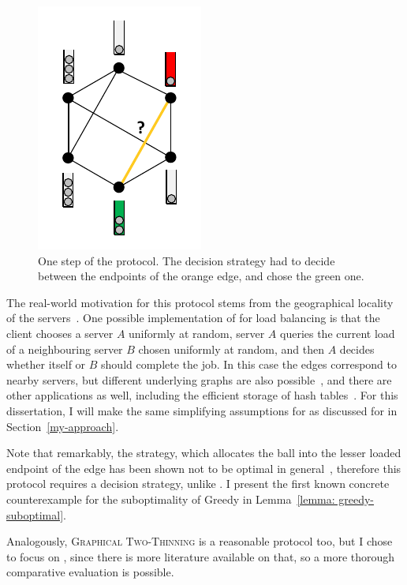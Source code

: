 \begin{figure}[hbt!]
    \centering
    \includegraphics[scale=1.5]{Chapter2/Figs/graphical_two_choice_intro.pdf}
    \caption{One step of the \GraphicalTwoChoice protocol. The decision strategy had to decide between the endpoints of the orange edge, and chose the green one.}
    \label{graphical-two-choice-intro}
\end{figure}

The real-world motivation for this protocol stems from the geographical locality of the servers~\cite{krishnaram2006graphicaltwochoiceoriginal}. One possible implementation of \GraphicalTwoChoice for load balancing is that the client chooses a server $A$ uniformly at random, server $A$ queries the current load of a neighbouring server $B$ chosen uniformly at random, and then $A$ decides whether itself or $B$ should complete the job. In this case the edges correspond to nearby servers, but different underlying graphs are also possible~\cite{peres2015oneplusbeta}, and there are other applications as well, including the efficient storage of hash tables~\cite{krishnaram2006graphicaltwochoiceoriginal}. For this dissertation, I will make the same simplifying assumptions for \GraphicalTwoChoice as discussed for \TwoThinning in Section~\ref{my-approach}.


Note that remarkably, the \Greedy strategy, which allocates the ball into the lesser loaded endpoint of the edge has been shown not to be optimal in general~\cite{bansal2021twochoicegraphical}, therefore this protocol requires a decision strategy, unlike \TwoChoice. I present the first known concrete counterexample for the suboptimality of Greedy in Lemma~\ref{lemma: greedy-suboptimal}.


Analogously, \textsc{Graphical Two-Thinning} is a reasonable protocol too, but I chose to focus on \GraphicalTwoChoice, since there is more literature available on that, so a more thorough comparative evaluation is possible.\\


